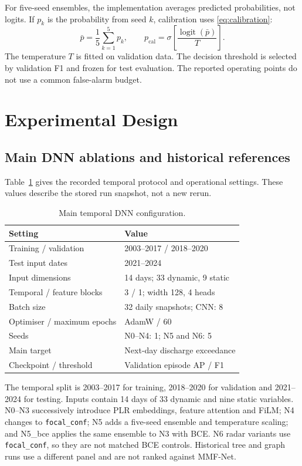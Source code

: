 \documentclass[conference]{IEEEtran}
\newcommand{\model}{MMF-Net}
\newcommand{\bce}{N5\_bce}
\begin{document}
For five-seed ensembles, the implementation averages predicted probabilities,
not logits. If $p_k$ is the probability from seed $k$, calibration uses
\eqref{eq:calibration}:
\begin{equation}
\bar p=\frac{1}{5}\sum_{k=1}^{5}p_k,\qquad
p_{\mathrm{cal}}=\sigma\!\left[\frac{\operatorname{logit}(\bar p)}{T}\right].
\label{eq:calibration}
\end{equation}
The temperature $T$ is fitted on validation data. The decision threshold is
selected by validation F1 and frozen for test evaluation. The reported
operating points do not use a common false-alarm budget.

\section{Experimental Design}
\subsection{Main DNN ablations and historical references}
Table~\ref{tab:settings} gives the recorded temporal protocol and operational
settings. These values describe the stored run snapshot, not a new rerun.

\begin{table}[t]
\caption{Main temporal DNN configuration.}
\label{tab:settings}
\centering\footnotesize
\begin{tabular}{@{}p{}p{}@{}}
\toprule
Setting & Value \\
\midrule
Training / validation & 2003--2017 / 2018--2020 \\
Test input dates & 2021--2024 \\
Input dimensions & 14 days; 33 dynamic, 9 static \\
Temporal / feature blocks & 3 / 1; width 128, 4 heads \\
Batch size & 32 daily snapshots; CNN: 8 \\
Optimiser / maximum epochs & AdamW / 60 \\
Seeds & N0--N4: 1; N5 and N6: 5 \\
Main target & Next-day discharge exceedance \\
Checkpoint / threshold & Validation episode AP / F1 \\
\bottomrule
\end{tabular}
\end{table}

The temporal split is 2003--2017 for training, 2018--2020 for validation and
2021--2024 for testing. Inputs contain 14 days of 33 dynamic and nine static
variables. N0--N3 successively introduce PLR embeddings, feature attention and
FiLM; N4 changes to \texttt{focal\_conf}; N5 adds a five-seed ensemble and
temperature scaling; and \bce{} applies the same ensemble to N3 with BCE.
N6 radar variants use \texttt{focal\_conf}, so they are not matched BCE controls.
Historical tree and graph runs use a different panel and are not ranked against
\model{}.
\end{document}

